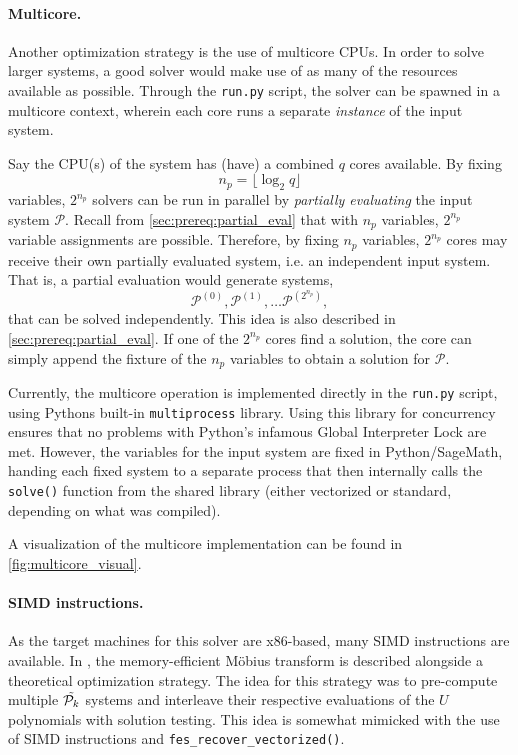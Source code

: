 \paragraph{Multicore.} Another optimization strategy is the use of multicore CPUs. In order to solve larger systems, a good solver would make use of as many of the resources available as possible. Through the \texttt{run.py} script, the solver can be spawned in a multicore context, wherein each core runs a separate \textit{instance} of the input system.

Say the CPU(s) of the system has (have) a combined $q$ cores available. By fixing 
$$
    n_{p} = \lfloor \log_2 q \rfloor
$$ 
variables, $2^{n_p}$ solvers can be run in parallel by \textit{partially evaluating} the input system $\mathcal{P}$. Recall from \cref{sec:prereq:partial_eval} that with $n_{p}$ variables, $2^{n_{p}}$ variable assignments are possible. Therefore, by fixing $n_{p}$ variables, $2^{n_{p}}$ cores may receive their own partially evaluated system, i.e. an independent input system. That is, a partial evaluation would generate systems,
$$
    \mathcal{P}^{(0)}, \mathcal{P}^{(1)}, \dots \mathcal{P}^{(2^{n_{p}})},
$$
that can be solved independently. This idea is also described in \cref{sec:prereq:partial_eval}. If one of the $2^{n_{p}}$ cores find a solution, the core can simply append the fixture of the $n_{p}$ variables to obtain a solution for $\mathcal{P}$.

Currently, the multicore operation is implemented directly in the \texttt{run.py} script, using Pythons built-in \texttt{multiprocess} library. Using this library for concurrency ensures that no problems with Python's infamous Global Interpreter Lock are met. However, the variables for the input system are fixed in Python/SageMath, handing each fixed system to a separate process that then internally calls the \texttt{solve()} function from the shared library (either vectorized or standard, depending on what was compiled).

A visualization of the multicore implementation can be found in \cref{fig:multicore_visual}.

\paragraph{SIMD instructions.} As the target machines for this solver are x86-based, many SIMD instructions are available. In \cite{eurocrypt-2021-30841}, the memory-efficient Möbius transform is described alongside a theoretical optimization strategy. The idea for this strategy was to pre-compute multiple $\Tilde{\mathcal{P}_k}$ systems and interleave their respective evaluations of the $U$ polynomials with solution testing. This idea is somewhat mimicked with the use of SIMD instructions and \texttt{fes\_recover\_vectorized()}.

